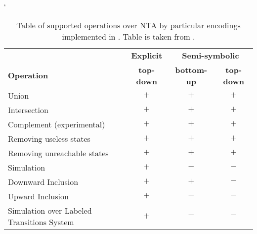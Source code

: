 \begin{table}[bt]
	\begin{center}
		\catcode`
		\begin{tabular}{| l | c | c | c |} \hline
		& {\textbf{Explicit}} & \multicolumn{2}{|c|}{\textbf{Semi-symbolic}} \\ \cline{2-4}
		\textbf{Operation} & \textbf{top-down} & \textbf{bottom-up} & \textbf{top-down} \\ \hline
		Union & $+$ & $+$ & $+$ \\
		Intersection & $+$ & $+$ & $+$ \\
		Complement (experimental) & $+$ & $+$ & $+$ \\
		Removing useless states & $+$ & $+$ & $+$ \\
		Removing unreachable states & $+$ & $+$ & $+$ \\
		Simulation & $+$ & $-$ & $-$ \\
		Downward Inclusion  & $+$ & $+$ & $-$ \\ 
		Upward Inclusion  & $+$ & $-$ & $-$ \\ 
		Simulation over Labeled Transitions System & $+$ & $-$ & $-$ \\ \hline
		\end{tabular}
	\caption{Table of supported operations over NTA by particular encodings implemented in \vata.
	Table is taken from \cite{bt:hruska}.}
	\label{tab:vataop}
	\end{center}
\end{table}
